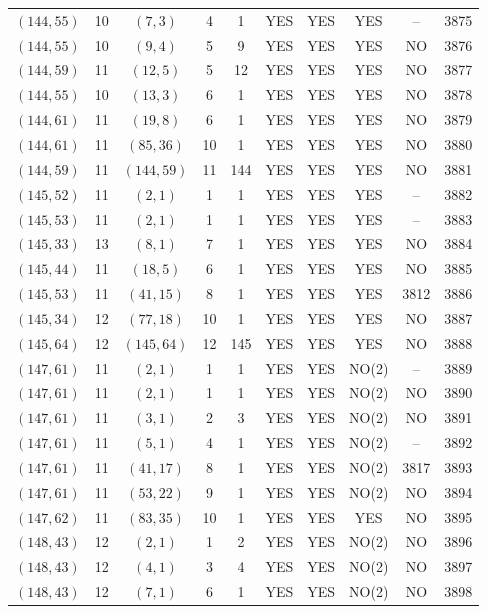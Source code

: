 \begin{longtable}{|c|c|c|c|c|c|c|c|c|c|}
$(144, 55)$ & 10 & $(7, 3)$ & 4 & 1 & YES & YES & YES & -- & 3875\\
$(144, 55)$ & 10 & $(9, 4)$ & 5 & 9 & YES & YES & YES & NO & 3876\\
$(144, 59)$ & 11 & $(12, 5)$ & 5 & 12 & YES & YES & YES & NO & 3877\\
$(144, 55)$ & 10 & $(13, 3)$ & 6 & 1 & YES & YES & YES & NO & 3878\\
$(144, 61)$ & 11 & $(19, 8)$ & 6 & 1 & YES & YES & YES & NO & 3879\\
$(144, 61)$ & 11 & $(85, 36)$ & 10 & 1 & YES & YES & YES & NO & 3880\\
$(144, 59)$ & 11 & $(144, 59)$ & 11 & 144 & YES & YES & YES & NO & 3881\\
$(145, 52)$ & 11 & $(2, 1)$ & 1 & 1 & YES & YES & YES & -- & 3882\\
$(145, 53)$ & 11 & $(2, 1)$ & 1 & 1 & YES & YES & YES & -- & 3883\\
$(145, 33)$ & 13 & $(8, 1)$ & 7 & 1 & YES & YES & YES & NO & 3884\\
$(145, 44)$ & 11 & $(18, 5)$ & 6 & 1 & YES & YES & YES & NO & 3885\\
$(145, 53)$ & 11 & $(41, 15)$ & 8 & 1 & YES & YES & YES & 3812 & 3886\\
$(145, 34)$ & 12 & $(77, 18)$ & 10 & 1 & YES & YES & YES & NO & 3887\\
$(145, 64)$ & 12 & $(145, 64)$ & 12 & 145 & YES & YES & YES & NO & 3888\\
$(147, 61)$ & 11 & $(2, 1)$ & 1 & 1 & YES & YES & NO(2) & -- & 3889\\
$(147, 61)$ & 11 & $(2, 1)$ & 1 & 1 & YES & YES & NO(2) & NO & 3890\\
$(147, 61)$ & 11 & $(3, 1)$ & 2 & 3 & YES & YES & NO(2) & NO & 3891\\
$(147, 61)$ & 11 & $(5, 1)$ & 4 & 1 & YES & YES & NO(2) & -- & 3892\\
$(147, 61)$ & 11 & $(41, 17)$ & 8 & 1 & YES & YES & NO(2) & 3817 & 3893\\
$(147, 61)$ & 11 & $(53, 22)$ & 9 & 1 & YES & YES & NO(2) & NO & 3894\\
$(147, 62)$ & 11 & $(83, 35)$ & 10 & 1 & YES & YES & YES & NO & 3895\\
$(148, 43)$ & 12 & $(2, 1)$ & 1 & 2 & YES & YES & NO(2) & NO & 3896\\
$(148, 43)$ & 12 & $(4, 1)$ & 3 & 4 & YES & YES & NO(2) & NO & 3897\\
$(148, 43)$ & 12 & $(7, 1)$ & 6 & 1 & YES & YES & NO(2) & NO & 3898\\

\end{longtable}
